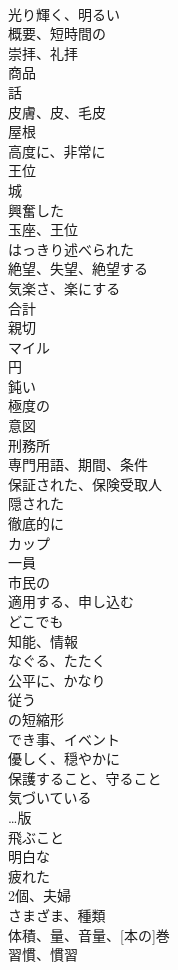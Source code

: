 \documentclass[8pt]{extreport}
\begin{document}
\begin{CJK}{UTF8}{min}
\\	光り輝く、明るい
\\	概要、短時間の
\\	崇拝、礼拝
\\	商品
\\	話
\\	皮膚、皮、毛皮
\\	屋根
\\	高度に、非常に
\\	王位
\\	城
\\	興奮した
\\	玉座、王位
\\	はっきり述べられた
\\	絶望、失望、絶望する
\\	気楽さ、楽にする
\\	合計
\\	親切
\\	マイル
\\	円
\\	鈍い
\\	極度の
\\	意図
\\	刑務所
\\	専門用語、期間、条件
\\	保証された、保険受取人
\\	隠された
\\	徹底的に
\\	カップ
\\	一員
\\	市民の
\\	適用する、申し込む
\\	どこでも
\\	知能、情報
\\	なぐる、たたく
\\	公平に、かなり
\\	従う
\\	の短縮形
\\	でき事、イベント
\\	優しく、穏やかに
\\	保護すること、守ること
\\	気づいている
\\	…版
\\	飛ぶこと
\\	明白な
\\	疲れた
\\	2個、夫婦
\\	さまざま、種類
\\	体積、量、音量、[本の]巻
\\	習慣、慣習

\end{CJK}
\end{document}
